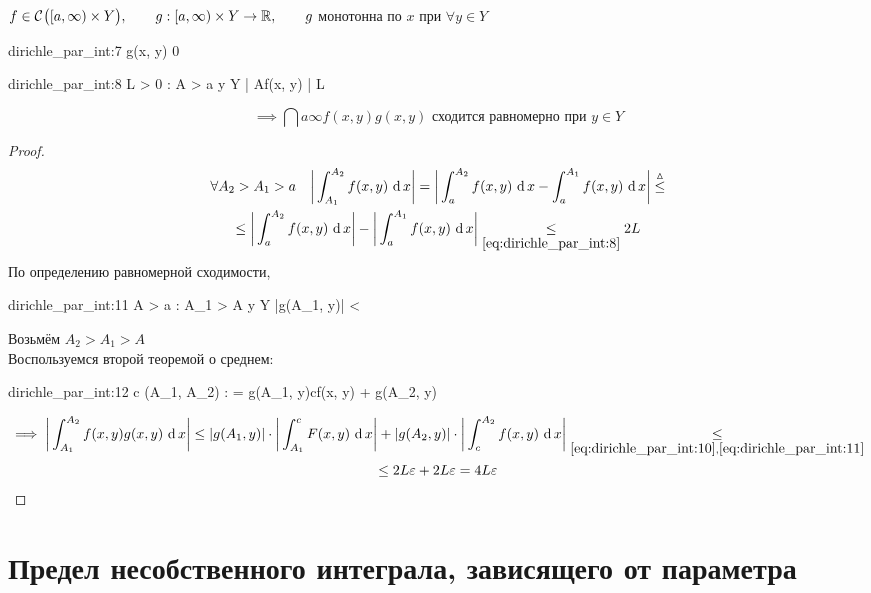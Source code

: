 \begin{theorem}
	$ f \in \mathcal{C}^{} \big( {[a, \infty) \times Y} \big) , \qquad g : [a, \infty) \times Y \to \mathbb{R}, \qquad g $ монотонна по $ x $ при $ \forall y \in Y $
	\begin{equ}{dirichle_par_int:7}
		g(x, y)  0
	\end{equ}
	\begin{equ}{dirichle_par_int:8}
		\exist L > 0 : \quad \forall A > a \quad \forall y \in Y \quad \bigg| A{f(x, y)} \bigg| \le L
	\end{equ}
	$$ \implies \dint{a}\infty{f(x, y)g(x, y)} \text{ сходится равномерно при } y \in Y $$
\end{theorem}

\begin{proof}
	\begin{multline}\lbl{dirichle_par_int:10}
		\forall A_2 > A_1 > a \quad \bigg| \dint{A_1}{A_2}{f(x, y)} \bigg| = \bigg| \dint{a}{A_2}{f(x, y)} - \dint{a}{A_1}{f(x, y)} \bigg| \trile \\
		\le \bigg| \dint{a}{A_2}{f(x, y)} \bigg| - \bigg| \dint{a}{A_1}{f(x, y)} \bigg| \underset{\eref{dirichle_par_int:8}}\le 2L
	\end{multline}
	По определению равномерной сходимости,
	\begin{equ}{dirichle_par_int:11}
		 \implies \exist A > a : \quad \forall A_1 > A \quad \forall y \in Y \quad |g(A_1, y)| < \veps
	\end{equ}
	Возьмём $ A_2 > A_1 > A $ \\
	Воспользуемся второй теоремой о среднем:
	\begin{equ}{dirichle_par_int:12}
		\exist c \in (A_1, A_2) : \quad {} = g(A_1, y)c{f(x, y)} + g(A_2, y)
	\end{equ}
	\begin{multline*}
		\implies \bigg| \dint{A_1}{A_2}{f(x, y)g(x, y)} \bigg| \le |g(A_1, y)| \cdot \bigg| \dint{A_1}c{F(x, y)} \bigg| + |g(A_2, y)| \cdot \bigg| \dint{c}{A_2}{f(x, y)} \bigg| \underset{\eref{dirichle_par_int:10}, \eref{dirichle_par_int:11}}\le \\
		\le 2L\veps + 2L\veps = 4L\veps
	\end{multline*}
\end{proof}

\section{Предел несобственного интеграла, зависящего от параметра}

